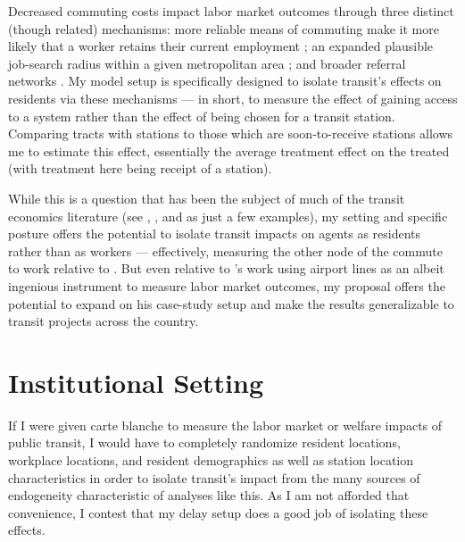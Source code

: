 \documentclass[12pt]{article}
\begin{document}
Decreased commuting costs impact labor market outcomes through three distinct (though related) mechanisms: more reliable means of commuting make it more likely that a worker retains their current employment \parencite{sanchezConnectionPublicTransit1999}; an expanded plausible job-search radius within a given metropolitan area \parencite{perezUrbanTransitInfrastructure2022, donaldsonRailroadsAmericanEconomic2016}; and broader referral networks \parencite{patacchini_referral_fx, kimSpatialInteractions2023}. My model setup is specifically designed to isolate transit's effects on residents via these mechanisms --- in short, to measure the effect of gaining access to a system rather than the effect of being chosen for a transit station. Comparing tracts with stations to those which are soon-to-receive stations allows me to estimate this effect, essentially the average treatment effect on the treated (with treatment here being receipt of a station). 

While this is a question that has been the subject of much of the transit economics literature (see \textcite{tsivanidisEvaluatingImpactUrban2026}, \textcite{tyndall_airports}, and \textcite{Gupta} as just a few examples), my setting and specific posture offers the potential to isolate transit impacts on agents as residents rather than as workers --- effectively, measuring the other node of the commute to work relative to \citeauthor{tsivanidisEvaluatingImpactUrban2026}. But even relative to \citeauthor{tyndall_airports}'s work using airport lines as an albeit ingenious instrument to measure labor market outcomes, my proposal offers the potential to expand on his case-study setup and make the results generalizable to transit projects across the country. 

\section{Institutional Setting}
If I were given carte blanche to measure the labor market or welfare impacts of public transit, I would have to completely randomize resident locations, workplace locations, and resident demographics as well as station location characteristics in order to isolate transit's impact from the many sources of endogeneity characteristic of analyses like this. As I am not afforded that convenience, I contest that my delay setup does a good job of isolating these effects. 
\end{document}
